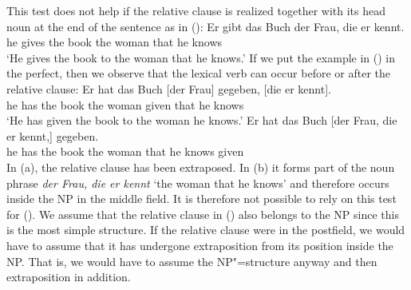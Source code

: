 \noindent
This test does not help if the relative clause is realized together with its head noun at the end of the sentence as in ():
\ea
\gll Er gibt das Buch der Frau, die er kennt.\\
      he gives the book the woman that he knows\\
\glt `He gives the book to the woman that he knows.'
\z
If we put the example in () in the perfect, then we observe that the lexical verb can occur before or after the relative clause:
\eal
\ex 
\gll Er hat das Buch [der Frau] gegeben, [die er kennt].\\
     he has the book \spacebr{}the woman given \spacebr{}that he knows\\
\glt `He has given the book to the woman he knows.'
\ex 
\gll Er hat das Buch [der Frau, die er kennt,] gegeben.\\
	 he has the book \spacebr{}the woman that he knows given\\
\zl
In (a), the relative clause has been extraposed. In (b) it forms part of the noun phrase \emph{der Frau, die er kennt} `the woman that he knows'
and therefore occurs inside the NP in the middle field. It is therefore not possible to rely on this test for (). We assume that the relative clause in ()
also belongs to the NP since this is the most simple structure. If the relative clause were in the
postfield, we would have to assume that it has undergone extraposition from its position inside
the NP. That is, we would have to assume the NP"=structure anyway and then extraposition in addition.%
%

